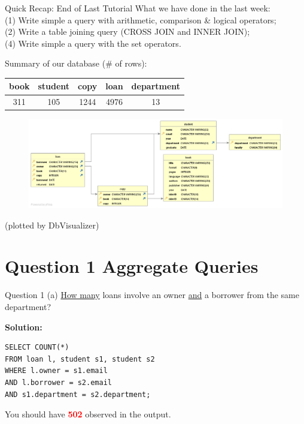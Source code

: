 \begin{frame}[fragile]{Quick Recap: End of Last Tutorial}
	What we have done in the last week:\\\vspace{5pt}
	(1) Write simple a query with arithmetic, comparison \& logical operators;\\
	(2) Write a table joining query (CROSS JOIN and INNER JOIN);\\
	(4) Write simple a query with the set operators.\\\vspace{5pt}
	
	Summary of our database (\# of rows):\\\vspace{5pt}
	\centering
	\begin{tabular}{|c|c|c|c|c|} \hline
		\textbf{book} & \textbf{student} & \textbf{copy} & \textbf{loan} & \textbf{department}\\ \hline
		311 & 105 & 1244 & 4976 & 13 \\ \hline
	\end{tabular}
	
	\begin{figure}
		\includegraphics[width=1\textwidth]{t1/images/t1-end.png}
	\end{figure}\vspace{-10pt}
	{\tiny(plotted by DbVisualizer)}
\end{frame}

\section*{Question 1 Aggregate Queries}

\begin{frame}[fragile]{Question 1 (a)}
\underline{How many} loans involve an owner \underline{and} a borrower from the same department?\\ \vspace{10pt}

\textbf{Solution:}\\
\begin{lstlisting}
SELECT COUNT(*)
FROM loan l, student s1, student s2
WHERE l.owner = s1.email 
AND l.borrower = s2.email
AND s1.department = s2.department;
\end{lstlisting}
\vspace{10pt}
You should have \textcolor{red}{\textbf{502}} observed in the output. 
\end{frame}


